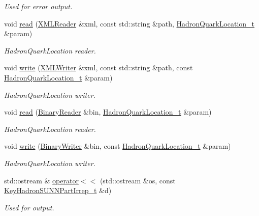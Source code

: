 \begin{DoxyCompactItemize}
\begin{DoxyCompactList}\small\item\em Used for error output. \end{DoxyCompactList}\item 
void \mbox{\hyperlink{namespaceHadron_a48b9ff1049a4c339c032065b538ed41f}{read}} (\mbox{\hyperlink{classADATXML_1_1XMLReader}{X\+M\+L\+Reader}} \&xml, const std\+::string \&path, \mbox{\hyperlink{structHadron_1_1HadronQuarkLocation__t}{Hadron\+Quark\+Location\+\_\+t}} \&param)
\begin{DoxyCompactList}\small\item\em Hadron\+Quark\+Location reader. \end{DoxyCompactList}\item 
void \mbox{\hyperlink{namespaceHadron_a2737e3c3e39c76c6dbe81ce5e484f6cc}{write}} (\mbox{\hyperlink{classADATXML_1_1XMLWriter}{X\+M\+L\+Writer}} \&xml, const std\+::string \&path, const \mbox{\hyperlink{structHadron_1_1HadronQuarkLocation__t}{Hadron\+Quark\+Location\+\_\+t}} \&param)
\begin{DoxyCompactList}\small\item\em Hadron\+Quark\+Location writer. \end{DoxyCompactList}\item 
void \mbox{\hyperlink{namespaceHadron_a6860ee691eb6d64d0fb2d52f4977316b}{read}} (\mbox{\hyperlink{classADATIO_1_1BinaryReader}{Binary\+Reader}} \&bin, \mbox{\hyperlink{structHadron_1_1HadronQuarkLocation__t}{Hadron\+Quark\+Location\+\_\+t}} \&param)
\begin{DoxyCompactList}\small\item\em Hadron\+Quark\+Location reader. \end{DoxyCompactList}\item 
void \mbox{\hyperlink{namespaceHadron_a8953a24e53ffe4d60e9c0ba26a48a9e3}{write}} (\mbox{\hyperlink{classADATIO_1_1BinaryWriter}{Binary\+Writer}} \&bin, const \mbox{\hyperlink{structHadron_1_1HadronQuarkLocation__t}{Hadron\+Quark\+Location\+\_\+t}} \&param)
\begin{DoxyCompactList}\small\item\em Hadron\+Quark\+Location writer. \end{DoxyCompactList}\item 
std\+::ostream \& \mbox{\hyperlink{namespaceHadron_a684b751246f1b7f63d5feafa97160408}{operator$<$$<$}} (std\+::ostream \&os, const \mbox{\hyperlink{structHadron_1_1KeyHadronSUNNPartIrrep__t}{Key\+Hadron\+S\+U\+N\+N\+Part\+Irrep\+\_\+t}} \&d)
\begin{DoxyCompactList}\small\item\em Used for output. \end{DoxyCompactList}\item 

\end{DoxyCompactItemize}
